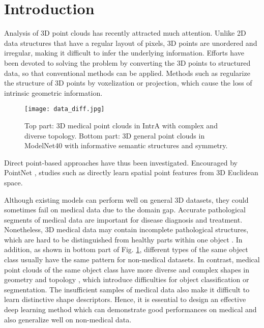 \documentclass[10pt,twocolumn,letterpaper]{article}
\begin{document}
\section{Introduction}
Analysis of 3D point clouds has recently attracted much attention. Unlike 2D data structures that have a regular layout of pixels, 3D points are unordered and irregular, making it difficult to infer the underlying information. Efforts have been devoted to solving the problem by converting the 3D points to structured data, so that conventional methods can be applied.
Methods such as \cite{wu20153d, qi2016volumetric, maturana2015voxnet, xie2016deepshape, wu2016learning, su2015multi} regularize the structure of 3D points by voxelization or projection, which cause the loss of intrinsic geometric information.
\begin{figure}
\centering\texttt{[image: data\_diff.jpg]}
\caption{
Top part: 3D medical point clouds in IntrA \cite{yang2020intra} with complex and diverse topology.
Bottom part: 3D general point clouds in ModelNet40 \cite{xie2016deepshape} with informative semantic structures and symmetry.} \label{fig:data_diff}
\end{figure}
Direct point-based approaches have thus been investigated. Encouraged by PointNet \cite{qi2017pointnet}, studies such as \cite{qi2017pointnet2,rsconv,pointgnn,pointcnn,Xiang_2021_ICCV,Zhang_2021_CVPR} directly learn spatial point features from 3D Euclidean space.


Although existing models can perform well on general 3D datasets, they could sometimes fail on medical data due to the domain gap.
Accurate pathological segments of medical data are important for disease diagnosis and treatment.
Nonetheless, 3D medical data may contain incomplete pathological structures, which are hard to be distinguished from healthy parts within one object \cite{yang2020intra}.
In addition, as shown in bottom part of Fig. \ref{fig:data_diff}, different types of the same object class usually have the same pattern for non-medical datasets.
In contrast, medical point clouds of the same object class have more diverse and complex shapes in geometry and topology \cite{medmeshcnn}, which introduce difficulties for object classification or segmentation.
The insufficient samples of medical data also make it difficult to learn distinctive shape descriptors.
Hence, it is essential to design an effective deep learning method which can demonstrate good performances on medical and also generalize well on non-medical data.
\end{document}
